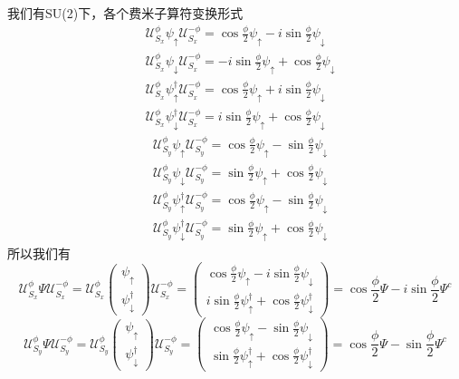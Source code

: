 \documentclass{article}
\numberwithin{equation}{subsection}
\newcommand{\mU}{\mathcal{U}}
\begin{document}
我们有SU(2)下，各个费米子算符变换形式
\begin{equation}
    \begin{split}
        &\mU_{S_x}^\phi\psi_\uparrow\mU_{S_x}^{-\phi}=\cos\frac{\phi}{2}\psi_\uparrow-i\sin\frac{\phi}{2}\psi_\downarrow\\
        &\mU_{S_x}^\phi\psi_\downarrow\mU_{S_x}^{-\phi}=-i\sin\frac{\phi}{2}\psi_\uparrow+\cos\frac{\phi}{2}\psi_\downarrow\\
        &\mU_{S_x}^\phi\psi_\uparrow^\dagger\mU_{S_x}^{-\phi}=\cos\frac{\phi}{2}\psi_\uparrow+i\sin\frac{\phi}{2}\psi_\downarrow\\
        &\mU_{S_x}^\phi\psi_\downarrow^\dagger\mU_{S_x}^{-\phi}=i\sin\frac{\phi}{2}\psi_\uparrow+\cos\frac{\phi}{2}\psi_\downarrow
    \end{split}
\end{equation}
\begin{equation}
    \begin{split}
        &\mU_{S_y}^\phi\psi_\uparrow\mU_{S_y}^{-\phi}=\cos\frac{\phi}{2}\psi_\uparrow-\sin\frac{\phi}{2}\psi_\downarrow\\
        &\mU_{S_y}^\phi\psi_\downarrow\mU_{S_y}^{-\phi}=\sin\frac{\phi}{2}\psi_\uparrow+\cos\frac{\phi}{2}\psi_\downarrow\\
        &\mU_{S_y}^\phi\psi_\uparrow^\dagger\mU_{S_y}^{-\phi}=\cos\frac{\phi}{2}\psi_\uparrow-\sin\frac{\phi}{2}\psi_\downarrow\\
        &\mU_{S_y}^\phi\psi_\downarrow^\dagger\mU_{S_y}^{-\phi}=\sin\frac{\phi}{2}\psi_\uparrow+\cos\frac{\phi}{2}\psi_\downarrow
    \end{split}
\end{equation}
所以我们有
\begin{equation}
    \mU_{S_x}^\phi\Psi\mU_{S_x}^{-\phi}=\mU_{S_x}^\phi\begin{pmatrix}
        \psi_\uparrow\\
        \psi_\downarrow^\dagger
    \end{pmatrix}\mU_{S_x}^{-\phi}=\begin{pmatrix}
        \cos\frac{\phi}{2}\psi_\uparrow-i\sin\frac{\phi}{2}\psi_\downarrow\\
        i\sin\frac{\phi}{2}\psi_\uparrow^\dagger+\cos\frac{\phi}{2}\psi_\downarrow^\dagger
    \end{pmatrix}=\cos\frac{\phi}{2}\Psi-i\sin\frac{\phi}{2}\Psi^c
\end{equation}
\begin{equation}
    \mU_{S_y}^\phi\Psi\mU_{S_y}^{-\phi}=\mU_{S_y}^\phi\begin{pmatrix}
        \psi_\uparrow\\
        \psi_\downarrow^\dagger
    \end{pmatrix}\mU_{S_y}^{-\phi}=\begin{pmatrix}
        \cos\frac{\phi}{2}\psi_\uparrow-\sin\frac{\phi}{2}\psi_\downarrow\\
        \sin\frac{\phi}{2}\psi_\uparrow^\dagger+\cos\frac{\phi}{2}\psi_\downarrow^\dagger
    \end{pmatrix}=\cos\frac{\phi}{2}\Psi-\sin\frac{\phi}{2}\Psi^c
\end{equation}
\end{document}
